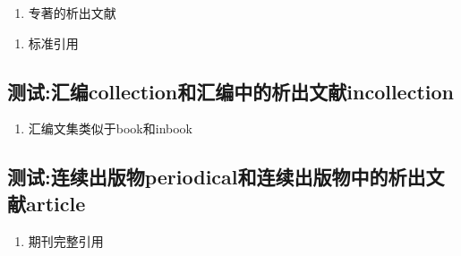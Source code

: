 \begin{refsection}

\begin{enumerate}
  \item 专著的析出文献\cite{马克思2013-302-302}\cite{王夫之2011-1109-1109}
  \cite{BUSECK1980-117-211,MARTIN1996-85-96,WEINSTEIN1974-745-772,白书农1998-146-163,陈晋镳1980-56-114,程根伟1999-32-36,楼梦麟2011-11-12,马克思1982-505-505,马克思2013-302-302,钟文发1996-468-471,1977-49-49,1988-590-590,王夫之2011-1109-1109}
\end{enumerate}

\printbibliography[heading=bibliography,title=【专著中的析出文献】]
\end{refsection}

\begin{refsection}

\begin{enumerate}
  \item 标准引用\cite{国家标准局信息分类编码研究所1988-59-92,国家环境保护局科技标准司1996-2-3, 全国广播电视标准化技术委员会2007-1-1,全国文献工作标准化委员会第七分委员会1986--,全国信息文献标准化技术委员会2010-3-3,中华人民共和国国家质量监督检验检疫总局2015,standardinfoiso158}
\end{enumerate}

\printbibliography[heading=bibliography,title=【标准】]
\end{refsection}

\subsection{测试:汇编collection和汇编中的析出文献incollection}
\begin{refsection}

\begin{enumerate}
  \item 汇编文集类似于book和inbook\cite{韩吉人1985-90-99}\cite{中国职工教育研究会1985--}
\end{enumerate}

\printbibliography[heading=bibliography,title=【汇编或文集】]
\end{refsection}


\subsection{测试:连续出版物periodical和连续出版物中的析出文献article}

\begin{refsection}

\begin{enumerate}
  \item 期刊完整引用\cite{中国地质学会1936--,中国图书馆学会1957--,AAAS1883--,中华医学会湖北分会1984--}
\end{enumerate}

\printbibliography[heading=bibliography,title=【连续出版物】]
\end{refsection}

